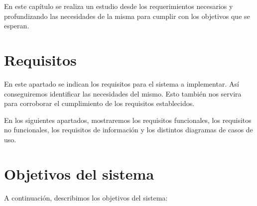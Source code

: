 En este capítulo se realiza un estudio desde los requerimientos necesarios y profundizando las necesidades de la misma para cumplir con los objetivos que se esperan.

\newpage

\section{Requisitos}
En este apartado se indican los requisitos para el sistema a implementar. Así conseguiremos identificar las necesidades del mismo. Esto también nos servira para corroborar el cumplimiento de los requisitos establecidos.

En los siguientes apartados, mostraremos los requisitos funcionales, los requisitos no funcionales, los requisitos de información y los distintos diagramas de casos de uso.

\section{Objetivos del sistema}
A continuación, describimos los objetivos del sistema:

\begin{table}[!htbp]
    \centering
    \caption{OBJ-0001}
\end{table}

\begin{table}[!htbp]
    \centering
    \caption{OBJ-0002}
\end{table}

